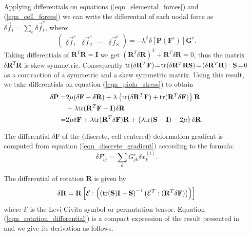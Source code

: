 Applying differentials on equations (\ref{eqn_elemental_forces}) and (\ref{eqn_cell_forces}) we can write the differential of each nodal force
as $\delta\vec{f}_i\!=\!\sum_e\delta\vec{f}_i^e$, where:
\begin{equation}
\left(
\begin{array}{cccc}
\delta\vec{f}_1^e &
\delta\vec{f}_2^e &
\cdots &
\delta\vec{f}_8^e
\end{array}
\right)
=-h^3\delta\left[\mathbf{P}(\mathbf{F}^e)\right]\mathbf{G}^e.
\label{eqn_elemental_force_differentials}
\end{equation}
Taking differentials of $\mathbf{R}^T\mathbf{R}\!\!=\!\!\mathbf{I}$ we get $(\mathbf{R}^T\!\delta\mathbf{R})^T\!+\!\mathbf{R}^T\!\delta\mathbf{R}\!=\!0$, thus the matrix $\delta\mathbf{R}^T\mathbf{R}$
is skew symmetric. Consequently $\mbox{tr}(\delta\mathbf{R}^T\mathbf{F})\!=\!\mbox{tr}(\delta\mathbf{R}^T\mathbf{RS})\!=\!(\delta\mathbf{R}^T\mathbf{R}):\mathbf{S}\!=\!0$ as a contraction of a
symmetric and a skew symmetric matrix. Using this result, we take differentials on equation (\ref{eqn_piola_stress}) to obtain
\begin{align}
  \delta\mathbf{P}=&2\mu(\delta\mathbf{F}-\delta\mathbf{R})+\lambda\left\{\mbox{tr}(\delta\mathbf{R}^T\mathbf{F})
  +\mbox{tr}(\mathbf{R}^T\delta\mathbf{F})\right\}\mathbf{R}\nonumber \\ 
  &+\lambda\mbox{tr}(\mathbf{R}^T\mathbf{F}-\mathbf{I})\delta\mathbf{R} \nonumber \\
  =&2\mu\delta\mathbf{F}+\lambda\mbox{tr}(\mathbf{R}^T\delta\mathbf{F})\mathbf{R}
  +\left\{\lambda\mbox{tr}(\mathbf{S}-\mathbf{I})-2\mu\right\}\delta\mathbf{R}. \label{eqn_stress_differential}
\end{align}

The differential $\delta\mathbf{F}$ of the (discrete, cell-centered) deformation gradient is computed from equation (\ref{eqn_discrete_gradient}) according to the formula:
\begin{equation}
\delta F_{ij}^e=\sum_kG_{jk}^e\delta x_k^{(i)}.
\label{eqn_deformation_gradient_differential}
\end{equation}

The differential of rotation $\mathbf{R}$ is given by
\begin{equation}
\delta\mathbf{R}=\mathbf{R}\left[\mathcal{E}:\left(\left(\mbox{tr}(\mathbf{S})\mathbf{I}-\mathbf{S}\right)^{-1}\left(\mathcal{E}^T:(\mathbf{R}^T\delta\mathbf{F})\right)\right)\right]
\label{eqn_rotation_differential}
\end{equation}
where $\mathcal{E}$ is the Levi-Civita symbol or permutation tensor. Equation (\ref{eqn_rotation_differential})
is a compact expression of the result presented
in \cite{twigg2010point} and we give its derivation as follows.


